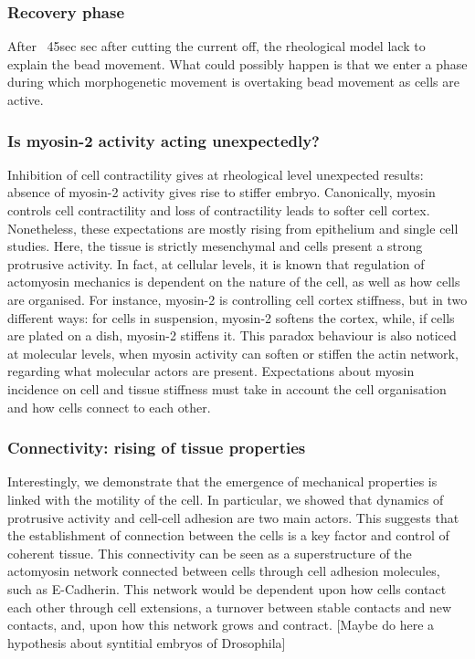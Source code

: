 \subsubsection{Recovery phase}
After ~45sec sec after cutting the current off, the rheological model lack to explain the bead movement.
What could possibly happen is that we enter a phase during which morphogenetic movement is overtaking bead movement as cells are active.

\subsubsection{Is myosin-2 activity acting unexpectedly?}
Inhibition of cell contractility gives at rheological level unexpected results: absence of myosin-2 activity gives rise to stiffer embryo.
Canonically, myosin controls cell contractility and loss of contractility leads to softer cell cortex.
Nonetheless, these expectations are mostly rising from epithelium and single cell studies.
Here, the tissue is strictly mesenchymal and cells present a strong protrusive activity.
In fact, at cellular levels, it is known that regulation of actomyosin mechanics is dependent on the nature of the cell, as well as how cells are organised.
For instance, myosin-2 is controlling cell cortex stiffness, but in two different ways: for cells in suspension, myosin-2 softens the cortex, while, if cells are plated on a dish, myosin-2 stiffens it.
This paradox behaviour is also noticed at molecular levels, when myosin activity can soften or stiffen the actin network, regarding what molecular actors are present.
Expectations about myosin incidence on cell and tissue stiffness must take in account the cell organisation and how cells connect to each other.

\subsubsection{Connectivity: rising of tissue properties}
Interestingly, we demonstrate that the emergence of mechanical properties is linked with the motility of the cell.
In particular, we showed that dynamics of protrusive activity and cell-cell adhesion are two main actors.
This suggests that the establishment of connection between the cells is a key factor and control of coherent tissue.
This connectivity can be seen as a superstructure of the actomyosin network connected between cells through cell adhesion molecules, such as E-Cadherin. This network would be dependent upon how cells contact each other through cell extensions, a turnover between stable contacts and new contacts, and, upon how this network grows and contract. [Maybe do here a hypothesis about syntitial embryos of Drosophila]

